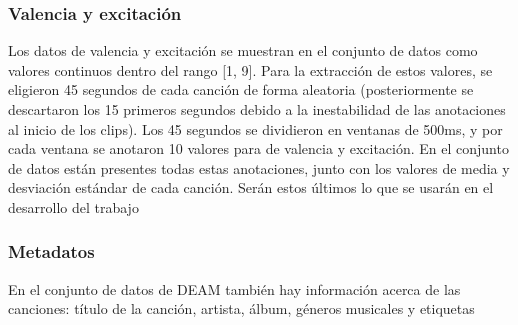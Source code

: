 \documentclass[12pt,a4paper,Spanish]{article}
\begin{document}
\subsubsection{Valencia y excitación}
Los datos de valencia y excitación se muestran en el conjunto de datos como valores continuos dentro del rango [1, 9].
\newline
Para la extracción de estos valores, se eligieron 45 segundos de cada canción de forma aleatoria (posteriormente se descartaron los 15 primeros segundos debido a la inestabilidad de las anotaciones al inicio de los clips). Los 45 segundos se dividieron en ventanas de 500ms, y por cada ventana se anotaron 10 valores para de valencia y excitación.
\newline
En el conjunto de datos están presentes todas estas anotaciones, junto con los valores de media y desviación estándar de cada canción. Serán estos últimos lo que se usarán en el desarrollo del trabajo

\subsubsection{Metadatos}
En el conjunto de datos de DEAM \cite{AlajankiEmoInMusicAnalysis} también hay información acerca de las canciones: título de la canción, artista, álbum, géneros musicales y etiquetas
\end{document}
